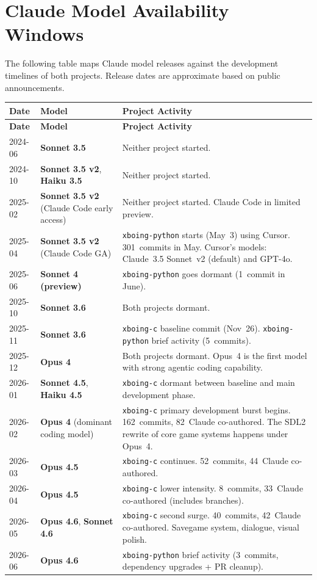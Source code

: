 \documentclass[a4paper,10pt]{article}
\newcommand{\repo}[1]{\texttt{#1}}
\newcommand{\model}[1]{\textbf{#1}}
\begin{document}
\section{Claude Model Availability Windows}

The following table maps Claude model releases against the development
timelines of both projects.  Release dates are approximate based on
public announcements.

\begin{longtable}{@{}llp{6cm}@{}}
\toprule
\textbf{Date} & \textbf{Model} & \textbf{Project Activity} \\
\midrule
\endfirsthead
\toprule
\textbf{Date} & \textbf{Model} & \textbf{Project Activity} \\
\midrule
\endhead
2024-06 & \model{Sonnet 3.5} &
  Neither project started. \\
2024-10 & \model{Sonnet 3.5 v2}, \model{Haiku 3.5} &
  Neither project started. \\
2025-02 & \model{Sonnet 3.5 v2} (Claude Code early access) &
  Neither project started. Claude Code in limited
  preview. \\
\midrule
2025-04 & \model{Sonnet 3.5 v2} (Claude Code GA) &
  \repo{xboing-python} starts (May~3) using Cursor.
  301~commits in May.  Cursor's models: Claude~3.5
  Sonnet~v2 (default) and GPT-4o. \\
2025-06 & \model{Sonnet 4 (preview)} &
  \repo{xboing-python} goes dormant (1~commit in June). \\
2025-10 & \model{Sonnet 3.6} &
  Both projects dormant. \\
\midrule
2025-11 & \model{Sonnet 3.6} &
  \repo{xboing-c} baseline commit (Nov~26).
  \repo{xboing-python} brief activity (5~commits). \\
2025-12 & \model{Opus 4} &
  Both projects dormant.  Opus~4 is the first model
  with strong agentic coding capability. \\
2026-01 & \model{Sonnet 4.5}, \model{Haiku 4.5} &
  \repo{xboing-c} dormant between baseline and main
  development phase. \\
\midrule
2026-02 & \model{Opus 4} (dominant coding model) &
  \repo{xboing-c} primary development burst begins.
  162~commits, 82~Claude co-authored.  The SDL2
  rewrite of core game systems happens under Opus~4. \\
2026-03 & \model{Opus 4.5} &
  \repo{xboing-c} continues.  52~commits,
  44~Claude co-authored. \\
2026-04 & \model{Opus 4.5} &
  \repo{xboing-c} lower intensity.  8~commits,
  33~Claude co-authored (includes branches). \\
2026-05 & \model{Opus 4.6}, \model{Sonnet 4.6} &
  \repo{xboing-c} second surge.  40~commits,
  42~Claude co-authored.  Savegame system, dialogue,
  visual polish. \\
2026-06 & \model{Opus 4.6} &
  \repo{xboing-python} brief activity (3~commits,
  dependency upgrades + PR cleanup). \\
\bottomrule
\end{longtable}
\end{document}
